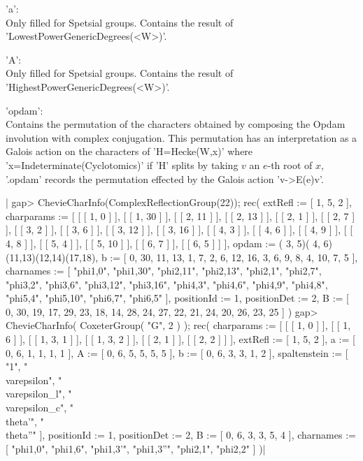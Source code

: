 'a':\\ Only filled for Spetsial groups. Contains the result of
   'LowestPowerGenericDegrees(<W>)'.

'A':\\ Only filled for Spetsial groups. Contains the result of
   'HighestPowerGenericDegrees(<W>)'.

'opdam':\\ Contains the permutation of the characters obtained by composing
   the  Opdam involution with complex  conjugation. This permutation has an
   interpretation  as a Galois action on the characters of 'H\:=Hecke(W,x)'
   where  'x\:=Indeterminate(Cyclotomics)'\: if 'H' splits by taking $v$ an
   $e$-th  root of  $x$, '.opdam'  records the  permutation effected by the
   Galois action 'v->E(e)\*v'.

|    gap> ChevieCharInfo(ComplexReflectionGroup(22));
    rec(
      extRefl := [ 1, 5, 2 ],
      charparams :=
       [ [ [ 1, 0 ] ], [ [ 1, 30 ] ], [ [ 2, 11 ] ], [ [ 2, 13 ] ],
          [ [ 2, 1 ] ], [ [ 2, 7 ] ], [ [ 3, 2 ] ], [ [ 3, 6 ] ],
          [ [ 3, 12 ] ], [ [ 3, 16 ] ], [ [ 4, 3 ] ], [ [ 4, 6 ] ],
          [ [ 4, 9 ] ], [ [ 4, 8 ] ], [ [ 5, 4 ] ], [ [ 5, 10 ] ],
          [ [ 6, 7 ] ], [ [ 6, 5 ] ] ],
      opdam := ( 3, 5)( 4, 6)(11,13)(12,14)(17,18),
      b := [ 0, 30, 11, 13, 1, 7, 2, 6, 12, 16, 3, 6, 9, 8, 4, 10, 7, 5 ],
      charnames := [ "phi{1,0}", "phi{1,30}", "phi{2,11}", "phi{2,13}",
          "phi{2,1}", "phi{2,7}", "phi{3,2}", "phi{3,6}", "phi{3,12}",
          "phi{3,16}", "phi{4,3}", "phi{4,6}", "phi{4,9}", "phi{4,8}",
          "phi{5,4}", "phi{5,10}", "phi{6,7}", "phi{6,5}" ],
      positionId := 1,
      positionDet := 2,
      B := [ 0, 30, 19, 17, 29, 23, 18, 14, 28, 24, 27, 22, 21, 24, 20,
          26, 23, 25 ] )
    gap>  ChevieCharInfo( CoxeterGroup( "G", 2 ) );
    rec(
      charparams :=
       [ [ [ 1, 0 ] ], [ [ 1, 6 ] ], [ [ 1, 3, 1 ] ], [ [ 1, 3, 2 ] ],
          [ [ 2, 1 ] ], [ [ 2, 2 ] ] ],
      extRefl := [ 1, 5, 2 ],
      a := [ 0, 6, 1, 1, 1, 1 ],
      A := [ 0, 6, 5, 5, 5, 5 ],
      b := [ 0, 6, 3, 3, 1, 2 ],
      spaltenstein :=
       [ "1", "\\varepsilon", "\\varepsilon_l", "\\varepsilon_c",
          "\\theta'", "\\theta''" ],
      positionId := 1,
      positionDet := 2,
      B := [ 0, 6, 3, 3, 5, 4 ],
      charnames := [ "phi{1,0}", "phi{1,6}", "phi{1,3}'", "phi{1,3}''",
          "phi{2,1}", "phi{2,2}" ] )|

